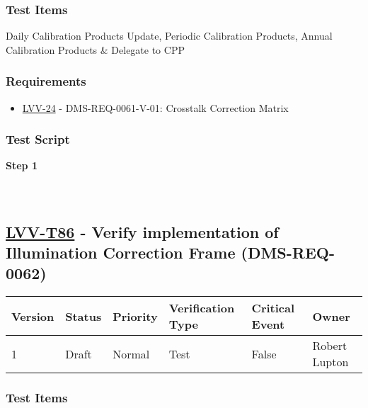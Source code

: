 \hypertarget{test-items-61}{%
\subsubsection{Test Items}\label{test-items-61}}

Daily Calibration Products Update, Periodic Calibration Products, Annual
Calibration Products \& Delegate to CPP

\hypertarget{requirements-62}{%
\subsubsection{Requirements}\label{requirements-62}}

\begin{itemize}
\tightlist
\item
  \href{https://jira.lsstcorp.org/browse/LVV-24}{LVV-24} -
  DMS-REQ-0061-V-01: Crosstalk Correction Matrix
\end{itemize}

\hypertarget{test-script-62}{%
\subsubsection{Test Script}\label{test-script-62}}

\textbf{Step 1}\\
~\\
~\\

\hypertarget{lvv-t86---verify-implementation-of-illumination-correction-frame-dms-req-0062}{%
\subsection{\texorpdfstring{\href{https://jira.lsstcorp.org/secure/Tests.jspa\#/testCase/LVV-T86}{LVV-T86}
- Verify implementation of Illumination Correction Frame
(DMS-REQ-0062)}{LVV-T86 - Verify implementation of Illumination Correction Frame (DMS-REQ-0062)}}\label{lvv-t86---verify-implementation-of-illumination-correction-frame-dms-req-0062}}

\begin{longtable}[]{@{}llllll@{}}
\toprule
Version & Status & Priority & Verification Type & Critical Event &
Owner\tabularnewline
\midrule
\endhead
1 & Draft & Normal & Test & False & Robert Lupton\tabularnewline
\bottomrule
\end{longtable}

\hypertarget{test-items-62}{%
\subsubsection{Test Items}\label{test-items-62}}


